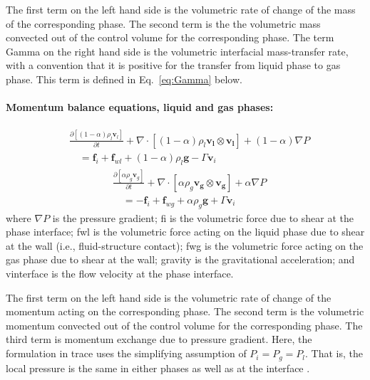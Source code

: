 The first term on the left hand side is the volumetric rate of change of the mass of the corresponding phase.
The second term is the the volumetric mass convected out of the control volume for the corresponding phase.
The term \gls{Gamma} on the right hand side is the volumetric interfacial mass-transfer rate,
with a convention that it is positive for the transfer from liquid phase to gas phase.
This term is defined in Eq.~\ref{eq:Gamma} below.

\paragraph{Momentum balance equations, liquid and gas phases:}
\begin{equation}
	\begin{split}
		& \frac{\partial [(1-\alpha)\rho_l \mathbf{v}_l]}{\partial t} + \nabla \cdot [(1-\alpha) \rho_l \mathbf{v_l} \otimes \mathbf{v_l}] + (1 - \alpha) \nabla P \\
		& \quad = \mathbf{f}_i + \mathbf{f}_{wl} + (1 - \alpha) \rho_l \mathbf{g} - \Gamma \mathbf{v}_i
	\end{split}
\label{eq:momentum_balance_liquid}
\end{equation}
\begin{equation}
	\begin{split}
		& \frac{\partial [\alpha \rho_g \mathbf{v}_g]}{\partial t} + \nabla \cdot [\alpha \rho_g \mathbf{v_g} \otimes \mathbf{v_g}] + \alpha \nabla P \\
		& \quad = - \mathbf{f}_i + \mathbf{f}_{wg} + \alpha \rho_g \mathbf{g} + \Gamma \mathbf{v}_i
	\end{split}
\label{eq:momentum_balance_gas}
\end{equation}
where $\nabla P$ is the pressure gradient;
\gls{fi} is the volumetric force due to shear at the phase interface;
\gls{fwl} is the volumetric force acting on the liquid phase due to shear at the wall (i.e., fluid-structure contact);
\gls{fwg} is the volumetric force acting on the gas phase due to shear at the wall;
\gls{gravity} is the gravitational acceleration;
and \gls{vinterface} is the flow velocity at the phase interface.

The first term on the left hand side is the volumetric rate of change of the momentum acting on the corresponding phase.
The second term is the volumetric momentum convected out of the control volume for the corresponding phase.
The third term is momentum exchange due to pressure gradient.
Here, the formulation in \gls{trace} uses the simplifying assumption of $P_i = P_g = P_l$.
That is, the local pressure is the same in either phases as well as at the interface \cite{USNRC2012}.

